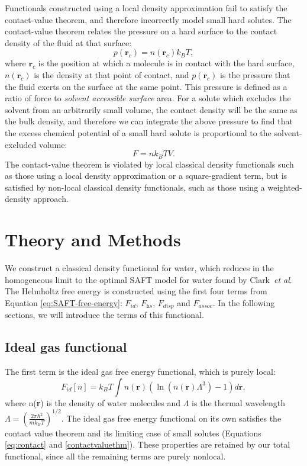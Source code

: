 \documentclass[twocolumn,amsmath,amssymb,prb]{revtex4-1}
\newcommand{\rr}{\textbf{r}}
\newcommand{\xx}{\textbf{r}}
\begin{document}
Functionals constructed using a local density approximation fail to
satisfy the contact-value theorem, and therefore incorrectly model
small hard solutes.  The contact-value theorem relates the pressure on
a hard surface to the contact density of the fluid at that
surface:
\begin{equation}\label{eq:contact}
  p(\rr_c) = n(\rr_c)k_BT,
\end{equation}
where $\rr_c$ is the position at which a molecule is in contact with
the hard surface, $n(\rr_c)$ is the density at that point of contact,
and $p(\rr_c)$ is the pressure that the fluid exerts on the surface at
the same point.  This pressure is defined as a ratio of force to
\emph{solvent accessible surface} area.
%
For a solute which excludes the solvent from an arbitrarily small
volume, the contact density will be the same as the bulk density, and
therefore we can integrate the above pressure to find that the excess
chemical potential of a small hard solute is proportional to the
solvent-excluded volume:
\begin{equation}\label{contactvaluethm}
  F = n k_BT V.
\end{equation}
The contact-value theorem is violated by local classical density
functionals such as those using a local density approximation or a
square-gradient term, but is satisfied by non-local classical density
functionals, such as those using a weighted-density approach.

\section{Theory and Methods}
We construct a classical density functional for water, which reduces
in the homogeneous limit to the optimal SAFT model for water found by
Clark~\emph{et al}.  The Helmholtz free energy is constructed using the
first four terms from Equation \ref{eq:SAFT-free-energy}: $F_\textit{id}$,
$F_\textit{hs}$, $F_\textit{disp}$ and $F_\textit{assoc}$.  In the
following sections, we will introduce the terms of this functional.

\subsection{Ideal gas functional}
The first term is the ideal gas free energy functional, which is
purely local:
\begin{equation}\label{idealgas}
  F_{id}[n] = k_B T \int n(\xx)\left( \ln({n(\xx){\Lambda}^3}) - 1\right) d\xx,
\end{equation}
where n(\xx) is the density of water molecules and $\Lambda$ is the
thermal wavelength
$ \Lambda = \left(\frac{2\pi\hbar^2}{mk_BT}\right )^{1/2}$.
The ideal gas free energy functional on its own satisfies the contact
value theorem and its limiting case of small solutes (Equations
\ref{eq:contact} and \ref{contactvaluethm}). These properties are
retained by our total functional, since all the remaining terms are
purely nonlocal.
\end{document}
